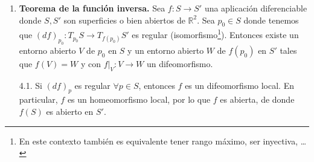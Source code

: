 \begin{enumerate}
\begin{proof}
            que es no vacío por hipótesis, cerrado en $S$ y bastará ver que $A$ es abierto en $S$ para demostrar que $f$ es constante. Para ello, si tomamos $p\in A$, sabemos que tiene que existir $X:U\subset \mathbb{R}^2\to S$ parametrización con $p\in X(U)$. Podemos escribir así:
            \begin{equation*}
                f\big|_{X(U)} = (f\circ X) \circ X^{-1}
            \end{equation*}
            Usando la regla de la cadena (la propiedad 1), para $q\in X(U)$ tenemos:
            \begin{equation*}
                0\equiv (d f)_q = d(f\circ X)_{X^{-1}(q)}\circ (dX^{-1})_q
            \end{equation*}
            Y como $X^{-1}$ es un difeomorfismo tenemos que $(dX^{-1})_q$ es un isomorfismo, por lo que debemos tener $d(f\circ X)_{X^{-1}(q)}\equiv 0$, para $f\circ X:U\to S'$ una aplicación del análisis (si $S'$ es una superficie basta componer con la inclusión) que tiene diferencial cero en todo punto, por lo que $f\circ X$ es constante, luego $f\big|_{X(U)}$ es constante, e igual a $a$. Hemos probado que $p\in X(U)\subset A$, por lo que $A$ es abierto en $S$, de donde $A = S$, con lo que $f$ es constante.
        \end{proof} 
    \item \textbf{Teorema de la función inversa.} Sea $f:S\to S'$ una aplicación diferenciable donde $S,S'$ son superficies o bien abiertos de $\mathbb{R}^2$. Sea $p_0\in S$ donde tenemos que $(d f)_{p_0}:T_{p_0}S\to T_{f(p_0)}S'$ es regular (isomorfismo\footnote{En este contexto también es equivalente tener rango máximo, ser inyectiva, \ldots}). Entonces existe un entorno abierto $V$ de $p_0$ en $S$ y un entorno abierto $W$ de $f(p_0)$ en $S'$ tales que $f(V)=W$ y con $f\big|_V:V\to W$ un difeomorfismo.
    \item[4.1.] Si $(d f)_p$ es regular $\forall p\in S$, entonces $f$ es un difeomorfismo local. En particular, $f$ es un homeomorfismo local, por lo que $f$ es abierta, de donde $f(S)$ es abierto en $S'$.
\end{enumerate}


